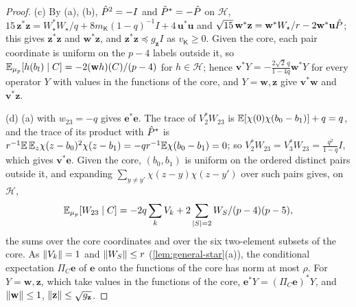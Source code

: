 \begin{proof}
(c) By (a), (b), $\hat P^2=-I$ and $\hat P^*=-\hat P$ on $\mathcal H$,
$15\,\mathbf z^*\mathbf z=W_\star^*W_\star/q+8m_{\mathsf K}(1-q)^{-1}I
+4\,\mathbf u^*\mathbf u$ and
$\sqrt{15}\,\mathbf w^*\mathbf z=\mathbf w^*W_\star/r-2\mathbf w^*\mathbf u\hat P$;
this gives $\mathbf z^*\mathbf z$ and $\mathbf w^*\mathbf z$, and
$\mathbf z^*\mathbf z\preceq g_{\mathbf z}I$ as $v_{\mathsf K}\ge0$. Given the
core, each pair coordinate is uniform on the $p-4$ labels outside it, so
$\mathbb E_{\mu_p}[h(b_l)\mid C]=-2(\mathbf wh)(C)/(p-4)$ for $h\in\mathcal H$; hence
$\mathbf v^*Y=-\frac{2\sqrt2\,q}{1-4q}\mathbf w^*Y$ for every operator $Y$ with
values in the functions of the core, and $Y=\mathbf w,\mathbf z$ give
$\mathbf v^*\mathbf w$ and $\mathbf v^*\mathbf z$.

(d) (a) with $w_{23}=-q$ gives $\mathbf e^*\mathbf e$.
The trace of $V_2^*W_{23}$ is $\mathbb E[\chi(0)\chi(b_0-b_1)]+q=q$, and the trace of
its product with $\hat P^*$ is $r^{-1}\mathbb E\,\mathbb E_z\chi(z-b_0)^2\chi(z-b_1)
=-qr^{-1}\mathbb E\chi(b_0-b_1)=0$; so
$V_2^*W_{23}=V_3^*W_{23}=\frac{q^2}{1-q}I$, which gives $\mathbf v^*\mathbf e$.
Given the core, $(b_0,b_1)$ is uniform on the ordered distinct pairs outside it,
and expanding $\sum_{y\ne y'}\chi(z-y)\chi(z-y')$ over such pairs gives, on
$\mathcal H$,
\[
 \mathbb E_{\mu_p}[W_{23}\mid C]=-2q\sum_kV_k+2\sum_{|S|=2}W_S/(p-4)(p-5),
\]
the sums over the core coordinates and over the six two-element subsets of the
core. As $\left\|V_k\right\|=1$ and $\left\|W_S\right\|\le r$ (\cref{lem:general-star}(a)), the
conditional expectation $\Pi_C\mathbf e$ of $\mathbf e$ onto the functions of the
core has norm at most $\rho$. For $Y=\mathbf w,\mathbf z$, which take values in
the functions of the core, $\mathbf e^*Y=(\Pi_C\mathbf e)^*Y$, and
$\left\|\mathbf w\right\|\le1$, $\left\|\mathbf z\right\|\le\sqrt{g_{\mathbf z}}$.


\end{proof}
